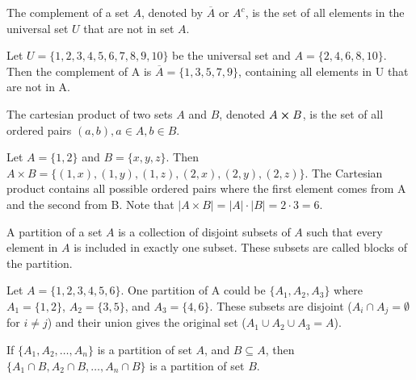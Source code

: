 \documentclass[12pt]{article}
\begin{document}
\vspace{12pt}



\begin{definition}[Complement]
    The complement of a set $A$, denoted by $\overline{A}$ or $A^{c}$, is the set of all elements in the universal set $U$ that are not in set $A$. 
\end{definition}

Let $U = \{1, 2, 3, 4, 5, 6, 7, 8, 9, 10\}$ be the universal set and $A = \{2, 4, 6, 8, 10\}$. Then the complement of A is $\overline{A} = \{1, 3, 5, 7, 9\}$, containing all elements in U that are not in A.



\vspace{12pt}


\begin{definition}
    The cartesian product of two sets $A$ and $B$, denoted $A \cross B$, is the set of all ordered pairs $(a, b), a \in A, b \in B$. 
\end{definition}


Let $A = \{1, 2\}$ and $B = \{x, y, z\}$. Then $A \times B = \{(1,x), (1,y), (1,z), (2,x), (2,y), (2,z)\}$. The Cartesian product contains all possible ordered pairs where the first element comes from A and the second from B. Note that $|A \times B| = |A| \cdot |B| = 2 \cdot 3 = 6$.



\vspace{12pt}


\begin{definition}
    A partition of a set $A$ is a collection of disjoint subsets of $A$ such that every element in $A$ is included in exactly one subset. These subsets are called blocks of the partition. 
\end{definition}

Let $A = \{1, 2, 3, 4, 5, 6\}$. One partition of A could be $\{A_1, A_2, A_3\}$ where $A_1 = \{1, 2\}$, $A_2 = \{3, 5\}$, and $A_3 = \{4, 6\}$. These subsets are disjoint ($A_i \cap A_j = \emptyset$ for $i \neq j$) and their union gives the original set ($A_1 \cup A_2 \cup A_3 = A$).




\vspace{12pt}

\begin{theorem}
    If $\{A_1, A_2, \ldots, A_n\}$ is a partition of set $A$, and $B \subseteq A$, then  $\{A_1 \cap B, A_2 \cap B, \ldots, A_n \cap B\}$ is a partition of set $B$.
\end{theorem}
\end{document}
